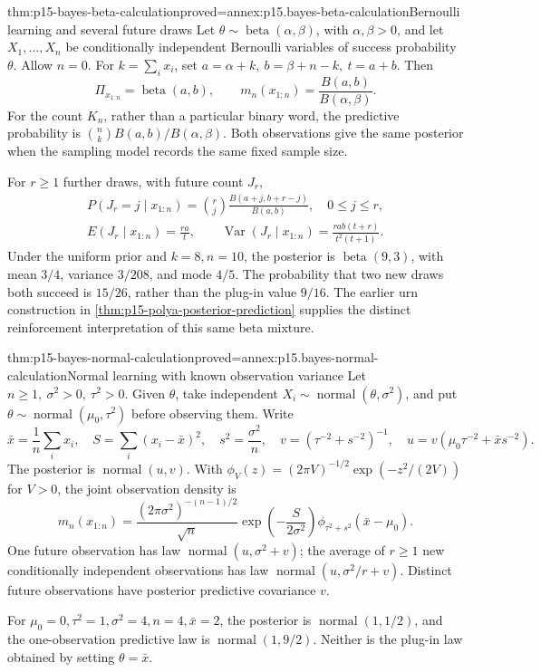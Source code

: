 \begin{hbtheorem}{thm:p15-bayes-beta-calculation}{proved=annex:p15.bayes-beta-calculation}{Bernoulli learning and several future draws}
Let \(\theta\sim\operatorname{beta}(\alpha,\beta)\), with
\(\alpha,\beta>0\), and let \(X_1,\ldots,X_n\) be conditionally
independent Bernoulli variables of success probability \(\theta\).
Allow \(n=0\). For \(k=\sum_i x_i\), set
\(a=\alpha+k,\ b=\beta+n-k,\ t=a+b\). Then
\[
 \Pi_{x_{1:n}}=\operatorname{beta}(a,b),\qquad
 m_n(x_{1:n})=\frac{B(a,b)}{B(\alpha,\beta)}.
\]
For the count \(K_n\), rather than a particular binary word, the
predictive probability is \(\binom nk B(a,b)/B(\alpha,\beta)\).
Both observations give the same posterior when the sampling model
records the same fixed sample size.

For \(r\geq1\) further draws, with future count \(J_r\),
\[
 \begin{gathered}
 P(J_r=j\mid x_{1:n})
    =\binom rj\frac{B(a+j,b+r-j)}{B(a,b)},\quad 0\leq j\leq r,\\
 E(J_r\mid x_{1:n})=\frac{ra}{t},\qquad
 \operatorname{Var}(J_r\mid x_{1:n})
     =\frac{rab(t+r)}{t^2(t+1)}.
 \end{gathered}
\]
Under the uniform prior and \(k=8,n=10\), the posterior is
\(\operatorname{beta}(9,3)\), with mean \(3/4\), variance \(3/208\),
and mode \(4/5\). The probability that two new draws both succeed
is \(15/26\), rather than the plug-in value \(9/16\).
The earlier urn construction in
\cref{thm:p15-polya-posterior-prediction} supplies the distinct
reinforcement interpretation of this same beta mixture.
\end{hbtheorem}

\begin{hbtheorem}{thm:p15-bayes-normal-calculation}{proved=annex:p15.bayes-normal-calculation}{Normal learning with known observation variance}
Let \(n\geq1,\ \sigma^2>0,\ \tau^2>0\).
Given \(\theta\), take independent
\(X_i\sim\operatorname{normal}(\theta,\sigma^2)\), and put
\(\theta\sim\operatorname{normal}(\mu_0,\tau^2)\) before observing them.
Write
\[
 \bar x=\frac1n\sum_i x_i,\quad
 S=\sum_i(x_i-\bar x)^2,\quad s^2=\frac{\sigma^2}{n},\quad
 v=(\tau^{-2}+s^{-2})^{-1},\quad
 u=v(\mu_0\tau^{-2}+\bar x s^{-2}).
\]
The posterior is \(\operatorname{normal}(u,v)\). With
\(\phi_V(z)=(2\pi V)^{-1/2}\exp(-z^2/(2V))\) for \(V>0\),
the joint observation density is
\[
 m_n(x_{1:n})
 =\frac{(2\pi\sigma^2)^{-(n-1)/2}}{\sqrt n}
       \exp\!\left(-\frac{S}{2\sigma^2}\right)
       \phi_{\tau^2+s^2}(\bar x-\mu_0).
\]
One future observation has law
\(\operatorname{normal}(u,\sigma^2+v)\); the average of \(r\geq1\)
new conditionally independent observations has law
\(\operatorname{normal}(u,\sigma^2/r+v)\).
Distinct future observations have posterior predictive covariance \(v\).

For \(\mu_0=0,\tau^2=1,\sigma^2=4,n=4,\bar x=2\), the posterior
is \(\operatorname{normal}(1,1/2)\), and the one-observation
predictive law is \(\operatorname{normal}(1,9/2)\).
Neither is the plug-in law obtained by setting \(\theta=\bar x\).
\end{hbtheorem}

